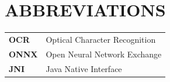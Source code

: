 \chapter*{ABBREVIATIONS}
%
%
\begin{tabular}{p{2cm} p{10cm}} 
  \textbf{OCR} & Optical Character Recognition \\ 
  \textbf{ONNX}& Open Neural Network Exchange \\ 
  \textbf{JNI} & Java Native Interface \\ 
\end{tabular}	




